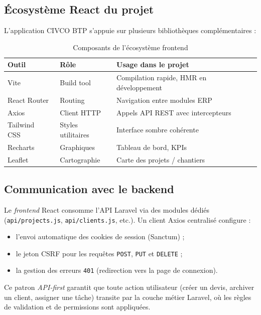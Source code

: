 \subsection{Écosystème React du projet}

L'application CIVCO BTP s'appuie sur plusieurs bibliothèques complémentaires :

\begin{table}[H]
\caption{Composants de l'écosystème frontend}
\label{tab:react_ecosystem}
\centering
\small
\begin{tabular}{|l|l|p{7.5cm}|}
\hline
\textbf{Outil} & \textbf{Rôle} & \textbf{Usage dans le projet} \\
\hline
Vite~\cite{vite} & Build tool & Compilation rapide, HMR en développement \\
\hline
React Router & Routing & Navigation entre modules ERP \\
\hline
Axios & Client HTTP & Appels API REST avec intercepteurs \\
\hline
Tailwind CSS~\cite{tailwindcss} & Styles utilitaires & Interface sombre cohérente \\
\hline
Recharts & Graphiques & Tableau de bord, KPIs \\
\hline
Leaflet & Cartographie & Carte des projets / chantiers \\
\hline
\end{tabular}
\end{table}

\subsection{Communication avec le backend}

Le \textit{frontend} React consomme l'API Laravel via des modules dédiés
(\texttt{api/projects.js}, \texttt{api/clients.js}, etc.). Un client Axios centralisé
configure :

\begin{itemize}
  \item l'envoi automatique des cookies de session (Sanctum) ;
  \item le jeton CSRF pour les requêtes \texttt{POST}, \texttt{PUT} et \texttt{DELETE} ;
  \item la gestion des erreurs \texttt{401} (redirection vers la page de connexion).
\end{itemize}

Ce patron \textit{API-first} garantit que toute action utilisateur (créer un devis,
archiver un client, assigner une tâche) transite par la couche métier Laravel, où les
règles de validation et de permissions sont appliquées.

